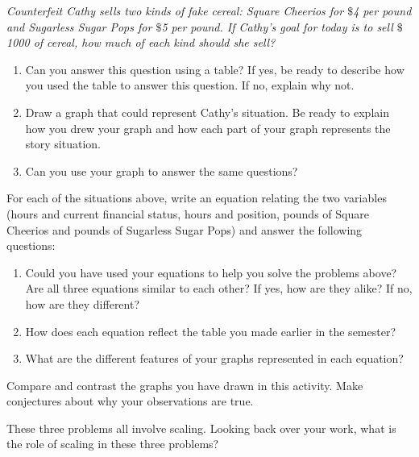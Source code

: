 \documentclass[nooutcomes]{ximera}
\begin{document}
\newpage
\begin{problem} 
\emph{Counterfeit Cathy sells two kinds of fake cereal: Square Cheerios for
$\$$4 per pound and Sugarless Sugar Pops for $\$$5 per pound.  If Cathy's goal for today is to sell $\$$1000 of cereal, how
  much of each kind should she sell?}

\begin{enumerate}
  \item Can you answer this question using a table? If yes, be ready to describe how you used the table to answer this question. If no, explain why not.
    \item Draw a graph that could represent Cathy's situation.  Be ready to explain how you drew your graph and how each part of your graph represents the story situation.
  \item Can you use your graph to answer the same questions?
  \end{enumerate}

\end{problem}

\begin{problem}
For each of the situations above, write an equation relating the two
variables (hours and current financial status, hours and position, 
pounds of Square Cheerios and pounds of Sugarless Sugar Pops) and
answer the following questions:
\begin{enumerate}
\item Could you have used your equations to help you solve the problems
  above? Are all three equations similar to each other? If yes, how are they alike?  If no, how are they different?
   \item How does each equation reflect the table you made earlier in the semester?
  \item  What are the different features of your graphs represented in each equation?
 \end{enumerate}

\end{problem}

\begin{problem} \label{Return5}
Compare and contrast the graphs you have drawn in this activity.  Make conjectures about why your observations are true.

\end{problem}

\begin{problem} 
These three problems all involve scaling.  Looking back over your work, what is the role of scaling in these three problems?


\end{problem}
\end{document}

